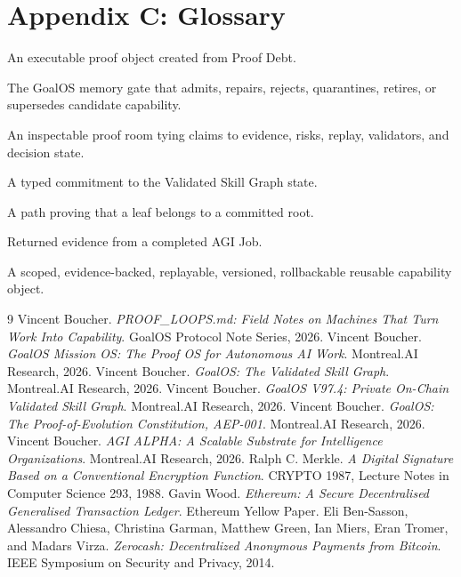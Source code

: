 \documentclass[11pt,letterpaper]{article}
\begin{document}
\section*{Appendix C: Glossary}
\begin{description}[style=nextline,leftmargin=1.3in]
\item[AGI Job] An executable proof object created from Proof Debt.
\item[Chronicle] The GoalOS memory gate that admits, repairs, rejects, quarantines, retires, or supersedes candidate capability.
\item[Evidence Docket] An inspectable proof room tying claims to evidence, risks, replay, validators, and decision state.
\item[Graph Root] A typed commitment to the Validated Skill Graph state.
\item[Merkle Proof] A path proving that a leaf belongs to a committed root.
\item[ProofBundle] Returned evidence from a completed AGI Job.
\item[Validated Skill] A scoped, evidence-backed, replayable, versioned, rollbackable reusable capability object.
\end{description}

\begin{thebibliography}{9}
 Vincent Boucher. \emph{PROOF\_LOOPS.md: Field Notes on Machines That Turn Work Into Capability}. GoalOS Protocol Note Series, 2026.
 Vincent Boucher. \emph{GoalOS Mission OS: The Proof OS for Autonomous AI Work}. Montreal.AI Research, 2026.
 Vincent Boucher. \emph{GoalOS: The Validated Skill Graph}. Montreal.AI Research, 2026.
 Vincent Boucher. \emph{GoalOS V97.4: Private On-Chain Validated Skill Graph}. Montreal.AI Research, 2026.
 Vincent Boucher. \emph{GoalOS: The Proof-of-Evolution Constitution, AEP-001}. Montreal.AI Research, 2026.
 Vincent Boucher. \emph{AGI ALPHA: A Scalable Substrate for Intelligence Organizations}. Montreal.AI Research, 2026.
 Ralph C. Merkle. \emph{A Digital Signature Based on a Conventional Encryption Function}. CRYPTO 1987, Lecture Notes in Computer Science 293, 1988.
 Gavin Wood. \emph{Ethereum: A Secure Decentralised Generalised Transaction Ledger}. Ethereum Yellow Paper.
 Eli Ben-Sasson, Alessandro Chiesa, Christina Garman, Matthew Green, Ian Miers, Eran Tromer, and Madars Virza. \emph{Zerocash: Decentralized Anonymous Payments from Bitcoin}. IEEE Symposium on Security and Privacy, 2014.
\end{thebibliography}
\end{document}
